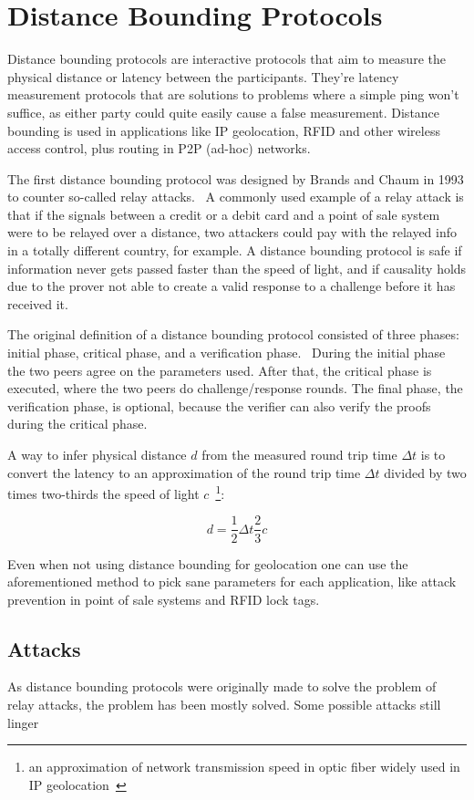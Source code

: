 \section{Distance Bounding Protocols}

Distance bounding protocols are interactive protocols that aim to measure the physical distance or latency between the participants. They're latency measurement protocols that are solutions to problems where a simple ping won't suffice, as either party could quite easily cause a false measurement. Distance bounding is used in applications like IP geolocation, RFID and other wireless access control, plus routing in P2P (ad-hoc) networks.

The first distance bounding protocol was designed by Brands and Chaum in 1993 to counter so-called relay attacks.~\cite{Boureanu_undated-bn, Brands1994-hz} A commonly used example of a relay attack is that if the signals between a credit or a debit card and a point of sale system were to be relayed over a distance, two attackers could pay with the relayed info in a totally different country, for example. A distance bounding protocol is safe if information never gets passed faster than the speed of light, and if causality holds due to the prover not able to create a valid response to a challenge before it has received it.~\cite{Boureanu_undated-bn}

The original definition of a distance bounding protocol consisted of three phases: initial phase, critical phase, and a verification phase.~\cite{Brands1994-hz, Mauw2018-uz} During the initial phase the two peers agree on the parameters used. After that, the critical phase is executed, where the two peers do challenge/response rounds. The final phase, the verification phase, is optional, because the verifier can also verify the proofs during the critical phase.

A way to infer physical distance $d$ from the measured round trip time $\Delta t$ is to convert the latency to an approximation of the round trip time $\Delta t$ divided by two times two-thirds the speed of light $c$~\footnote{an approximation of network transmission speed in optic fiber widely used in IP geolocation~\cite{Candela2020-am}}:

\begin{equation*}
  d = \frac{1}{2}\Delta t \frac{2}{3}c
\end{equation*}

Even when not using distance bounding for geolocation one can use the aforementioned method to pick sane parameters for each application, like attack prevention in point of sale systems and RFID lock tags.

\subsection{Attacks}
As distance bounding protocols were originally made to solve the problem of relay attacks, the problem has been mostly solved. Some possible attacks still linger